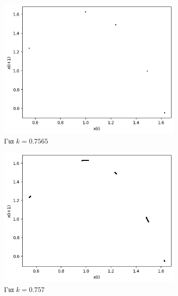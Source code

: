 \begin{figure}[ht]
\begin{subfigure}[b]{0.4\textwidth}
		\includegraphics[width=\textwidth]{LateX images/graphs q14/g21}
		\caption{Για $k=0.7565$}
		\label{f:k78}
	\end{subfigure}
	\hfill
	\begin{subfigure}[b]{0.4\textwidth}
		\centering
		\includegraphics[width=\textwidth]{LateX images/graphs q14/g22}
		\caption{Για $k=0.757$}
		\label{f:k79}
	\end{subfigure}
	\hfill	
	\begin{subfigure}[b]{0.4\textwidth}
		\centering

\end{subfigure}
\end{figure}
